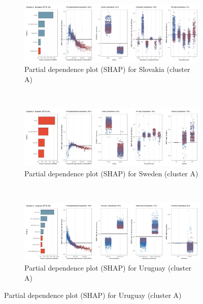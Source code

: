 \begin{figure}[ht!]\ContinuedFloat
    \centering
   \begin{subfigure}[b]{\textwidth}
   \centering
         \caption{Partial dependence plot (SHAP) for Slovakia (cluster A)}
         \label{fig:5b_SVK}
         \includegraphics[width=\textwidth]{Figure 5b/Figure_5b_SVK}
         \end{subfigure}
    \\
    \vspace{0.5cm}
   \begin{subfigure}[b]{\textwidth}
         \centering
         \caption{Partial dependence plot (SHAP) for Sweden (cluster A)}
         \label{fig:5b_SWE}
         \includegraphics[width=\textwidth]{Figure 5b/Figure_5b_SWE}
         \end{subfigure}
    \\
    \vspace{0.5cm}
   \begin{subfigure}[b]{\textwidth}
    \centering
         \caption{Partial dependence plot (SHAP) for Uruguay (cluster A)}
         \label{fig:5b_URY}
         \includegraphics[width=\textwidth]{Figure 5b/Figure_5b_URY}
         \end{subfigure}

\end{figure}
